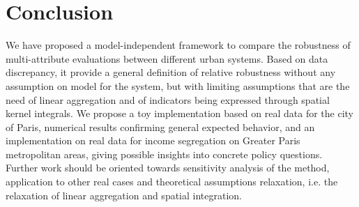 \documentclass[runningheads,a4paper]{llncs2e/llncs}
\begin{document}
\section*{Conclusion}

We have proposed a model-independent framework to compare the robustness of multi-attribute evaluations between different urban systems. Based on data discrepancy, it provide a general definition of relative robustness without any assumption on model for the system, but with limiting assumptions that are the need of linear aggregation and of indicators being expressed through spatial kernel integrals. We propose a toy implementation based on real data for the city of Paris, numerical results confirming general expected behavior, and an implementation on real data for income segregation on Greater Paris metropolitan areas, giving possible insights into concrete policy questions. Further work should be oriented towards sensitivity analysis of the method, application to other real cases and theoretical assumptions relaxation, i.e. the relaxation of linear aggregation and spatial integration.






\end{document}

